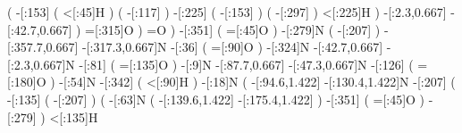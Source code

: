                                   (
                            -[:153]%
                                      (
                                 <[:45]H%
                                      )
                                      (
                                -[:117]\phantom{N}%
                                      )
                            -[:225]%
                                      (
                                -[:153]\phantom{N}%
                                      )
                                      (
                                -[:297]\phantom{N}%
                                      )
                            <[:225]H%
                                  )
                  -[:2.3,0.667]%
                 -[:42.7,0.667]\phantom{N}%
                              )
                    =[:315]O%
                          )
                      =O%
                      )
            -[:351]%
                      (
                 =[:45]O%
                      )
            -[:279]N%
                      (
                -[:207]%
                      )
    -[:357.7,0.667]%
    -[:317.3,0.667]N%
             -[:36]%
                      (
                 =[:90]O%
                      )
            -[:324]N%
     -[:42.7,0.667]%
      -[:2.3,0.667]N%
             -[:81]%
                      (
                =[:135]O%
                      )
              -[:9]N%
     -[:87.7,0.667]%
     -[:47.3,0.667]N%
            -[:126]%
                      (
                =[:180]O%
                      )
             -[:54]N%
            -[:342]%
                      (
                 <[:90]H%
                      )
             -[:18]N%
                      (
         -[:94.6,1.422]%
        -[:130.4,1.422]N%
                -[:207]%
                          (
                    -[:135]%
                              (
                        -[:207]\phantom{N}%
                              )
                              (
                         -[:63]N%
                                  (
                    -[:139.6,1.422]%
                    -[:175.4,1.422]\phantom{N}%
                                  )
                        -[:351]%
                                  (
                             =[:45]O%
                                  )
                        -[:279]\phantom{N}%
                              )
                    <[:135]H%
